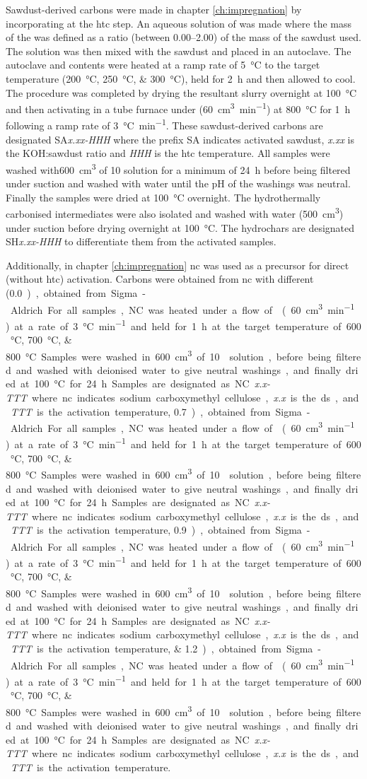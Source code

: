 Sawdust-derived carbons were made in chapter \ref{ch:impregnation} by incorporating  at the \gls{htc} step. An aqueous solution of  was made where the mass of the  was defined as a ratio (between \numrange{0.00}{2.00}) of the mass of the sawdust used. The solution was then mixed with the sawdust and placed in an autoclave. The autoclave and contents were heated at a ramp rate of \qty{5}{\degreeCelsius} to the target temperature (\qtylist[list-units=single, list-final-separator={ or }]{200;250;300}{\degreeCelsius}), held for \qty{2}{\hour} and then allowed to cool. The procedure was completed by drying the resultant slurry overnight at \qty{100}{\degreeCelsius} and then activating in a tube furnace under  (\qty{60}{\cm\cubed\per\minute}) at \qty{800}{\degreeCelsius} for \qty{1}{\hour} following a ramp rate of \qty{3}{\degreeCelsius\per\minute}. These sawdust-derived carbons are designated SA\textit{x.xx-HHH} where the prefix SA indicates activated sawdust, \textit{x.xx} is the KOH:sawdust ratio and \textit{HHH} is the \gls{htc} temperature. All samples were washed with\qty{600}{\cm\cubed} of \qty{10}{\volpercent}  solution for a minimum of \qty{24}{\hour} before being filtered under suction and washed with water until the pH of the washings was neutral. Finally the samples were dried at \qty{100}{\degreeCelsius} overnight. The hydrothermally carbonised intermediates were also isolated and washed with water (\qty{500}{\cm\cubed}) under suction before drying overnight at \qty{100}{\degreeCelsius}. The hydrochars are designated  SH\textit{x.xx-HHH} to differentiate them from the activated samples.

Additionally, in chapter \ref{ch:impregnation} \acrfull{nc} was used as a precursor for direct (without \gls{htc}) activation. Carbons were obtained from \acrshort{nc} with different  (\qtylist[list-final-separator={ or }, list-units=single]{0.0;0.7;0.9;1.2}), obtained from Sigma-Aldrich. For all samples, NC was heated under a flow of  (\qty{60}{\cm\cubed\per\minute}) at a rate of \qty{3}{\degreeCelsius\per\minute} and held for \qty{1}{\hour} at the target temperature of \qtylist[list-final-separator={ or }, list-units=single]{600;700;800}{\degreeCelsius}. Samples were washed in \qty{600}{\cm\cubed} of \qty{10}{\volpercent}  solution, before being filtered and washed with deionised water to give neutral washings, and finally dried at \qty{100}{\degreeCelsius} for \qty{24}{\hour}. Samples are designated as NC\textit{x.x-TTT} where \acrshort{nc} indicates sodium carboxymethyl cellulose, \textit{x.x} is the \acrshort{ds}, and \textit{TTT} is the activation temperature. 

